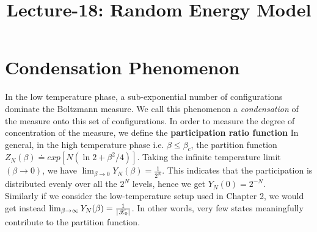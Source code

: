 \documentclass[letterpaper,english,10pt]{article}
\title{Lecture-18: Random Energy Model}
\begin{document}
\maketitle


\section{Condensation Phenomenon}
In the low temperature phase, a sub-exponential number of configurations dominate the Boltzmann measure. We call this phenomenon a \textit{condensation} of the measure onto this set of configurations.
In order to measure the degree of concentration of the measure, we define the \textbf{participation ratio function}
In general, in the high temperature phase i.e. $\beta \leq \beta_c$, the partition function $Z_N(\beta) \doteq exp[N(\ln2 + \beta^2/4)]$. Taking the infinite temperature limit $(\beta \to 0)$, we have $\lim_{\beta \to 0}Y_N(\beta) = \frac{1}{2^{N}}$. This indicates that the participation is distributed evenly over all the $2^N$ levels,
hence we get $Y_N (0) = 2^{-N}$.\\ 
Similarly if we consider the low-temperature setup used in Chapter 2, we would get instead $\lim_{\beta \to \infty}Y_N(\beta) = \frac{1}{\left\lvert\mathscr{X}_0\right\rvert}$. 
In other words, very few states meaningfully contribute to the partition function.
\end{document}
